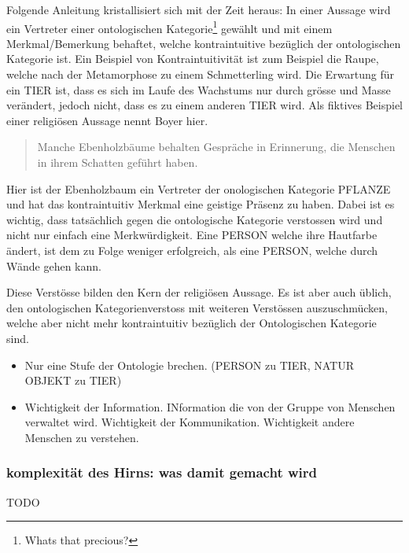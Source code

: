Folgende Anleitung kristallisiert sich mit der Zeit heraus: In einer Aussage wird ein Vertreter einer ontologischen Kategorie\footnote{Whats that precious?} gewählt und mit einem Merkmal/Bemerkung behaftet, welche kontraintuitive bezüglich der ontologischen Kategorie ist. Ein Beispiel von Kontraintuitivität ist zum Beispiel die Raupe, welche nach der Metamorphose zu einem Schmetterling wird. Die Erwartung für ein TIER ist, dass es sich im Laufe des Wachstums nur durch grösse und Masse verändert, jedoch nicht, dass es zu einem anderen TIER wird. Als fiktives Beispiel einer religiösen Aussage nennt Boyer hier. 
\begin{quote}Manche Ebenholzbäume behalten Gespräche in Erinnerung, die Menschen in ihrem Schatten geführt haben.\end{quote} 

Hier ist der Ebenholzbaum ein Vertreter der onologischen Kategorie PFLANZE und hat das kontraintuitiv Merkmal eine geistige Präsenz zu haben. Dabei ist es wichtig, dass tatsächlich gegen die ontologische Kategorie verstossen wird und nicht nur einfach eine Merkwürdigkeit. Eine PERSON welche ihre Hautfarbe ändert, ist dem zu Folge weniger erfolgreich, als eine PERSON, welche durch Wände gehen kann. 

Diese Verstösse bilden den Kern der religiösen Aussage. Es ist aber auch üblich, den ontologischen Kategorienverstoss mit weiteren Verstössen auszuschmücken, welche aber nicht mehr kontraintuitiv bezüglich der Ontologischen Kategorie sind.

\begin{itemize}
	\item Nur eine Stufe der Ontologie brechen. (PERSON zu TIER, NATUR OBJEKT zu TIER)
	\item Wichtigkeit der Information. INformation die von der Gruppe von Menschen verwaltet wird. Wichtigkeit der Kommunikation. Wichtigkeit andere Menschen zu verstehen.
\end{itemize}
\subsubsection*{komplexität des Hirns: was damit gemacht wird}

TODO